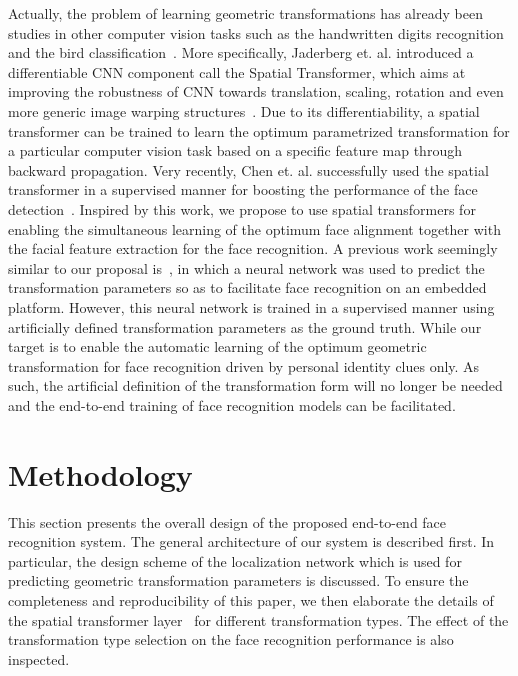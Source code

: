 \documentclass[10pt,twocolumn,letterpaper]{article}
\begin{document}
Actually, the problem of learning geometric transformations has already been studies in other computer vision tasks such as the handwritten digits recognition and the bird classification~\cite{jaderberg2015spatial}.  
More specifically, Jaderberg et. al. introduced a differentiable CNN component call the Spatial Transformer, which aims at improving the robustness of CNN towards translation, scaling, rotation and even more generic image warping structures~\cite{jaderberg2015spatial}. 
Due to its differentiability, a spatial transformer can be trained to learn the optimum parametrized transformation for a particular computer vision task based on a specific feature map through backward propagation. 
Very recently, Chen et. al. successfully used the spatial transformer in a supervised manner for boosting the performance of the face detection~\cite{chen2016supervised}. 
Inspired by this work, we propose to use spatial transformers for enabling the simultaneous learning of the optimum face alignment together with the facial feature extraction for the face recognition. 
A previous work seemingly similar to our proposal is~\cite{tadmor2016learning}, in which a neural network was used to predict the transformation parameters so as to facilitate face recognition on an embedded platform. 
However, this neural network is trained in a supervised manner using artificially defined transformation parameters as the ground truth. 
While our target is to enable the automatic learning of the optimum geometric transformation for face recognition driven by personal identity clues only.
As such, the artificial definition of the transformation form will no longer be needed and the end-to-end training of face recognition models can be facilitated.


\section{Methodology}


This section presents the overall design of the proposed end-to-end face recognition system. 
The general architecture of our system is described first. In particular, the design scheme of the localization network which is used for predicting geometric transformation parameters is discussed. 
To ensure the completeness and reproducibility of this paper, we then elaborate the details of the spatial transformer layer~\cite{jaderberg2015spatial} for different transformation types. 
The effect of the transformation type selection on the face recognition performance is also inspected.
\end{document}
